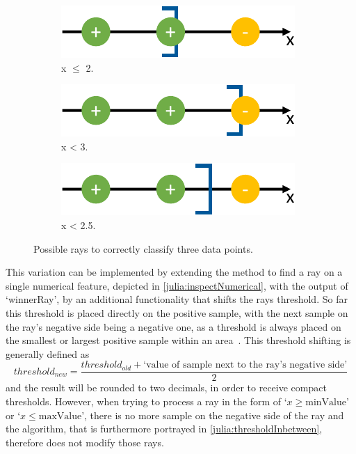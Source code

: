 \begin{figure}[h]
    \centering
    \begin{subfigure}{\textwidth}
        \centering
        \includegraphics[width=0.5\columnwidth]{figures/threshold_min.pdf}
        \caption{x \(\leq\) 2.}\label{fig:thresholdMin}
    \end{subfigure}
    \hfill
    \begin{subfigure}{\textwidth}
        \centering
        \includegraphics[width=0.5\columnwidth]{figures/threshold_max.pdf}
        \caption{x < 3.}\label{fig:thresholdMax}
    \end{subfigure}
    \hfill
    \begin{subfigure}{\textwidth}
        \centering
        \includegraphics[width=0.5\columnwidth]{figures/threshold_middle.pdf}
        \caption{x < 2.5.}\label{fig:thresholdMiddle}
    \end{subfigure}
    \caption{Possible rays to correctly classify three data points.}\label{fig:variousThresholds}
\end{figure}

This variation can be implemented by extending the method to find a ray on a single numerical feature, depicted in \autoref{julia:inspectNumerical},
with the output of `winnerRay', by an additional functionality that shifts the rays threshold.
So far this threshold is placed directly on the positive sample, with the next sample on the ray's
negative side being a negative one, as a threshold is always placed on the smallest or largest positive sample within an area~\citep{schmid}.
This threshold shifting is generally defined as
\[threshold_{new} = \frac{threshold_{old} + \text{`value of sample next to the ray's negative side'}}{2}\]
and the result will be rounded to two decimals, in order to receive compact thresholds.
However, when trying to process a ray in the form of `\(x \geq \text{minValue}\)' or `\(x \leq \text{maxValue}\)',
there is no more sample on the negative side of the ray and the algorithm, that is furthermore
portrayed in \autoref{julia:thresholdInbetween}, therefore does not modify those rays.

